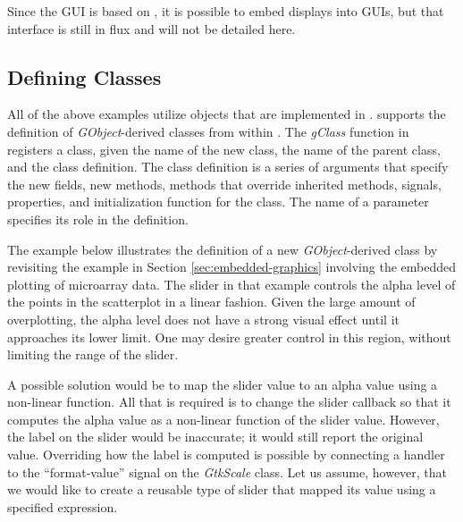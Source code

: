 \documentclass[article]{jss}
\begin{document}
Since the  GUI is based on , it is possible to
embed 
 displays into  GUIs, but that interface is
still in flux
and will not be detailed here.

\subsection[Defining GObject Classes]{Defining  Classes}

All of the above examples utilize objects that are implemented in
.
 supports the definition of \emph{GObject}-derived classes
from within
.  The \emph{gClass} function in  registers a 
class, given the name of the new class, the name of the parent class,
and the class 
definition. The class definition is a series of arguments that specify the new fields, new methods, 
methods that override inherited methods,
 signals, properties, and
initialization function for the class. The name of a parameter
specifies
its role in the definition. 

The example below illustrates the definition of a new
\emph{GObject}-derived
class by revisiting the example in Section \ref{sec:embedded-graphics} involving the embedded plotting of 
microarray data.
The slider in that example controls the alpha level of the
points in the scatterplot in a linear fashion. Given the large amount
of
overplotting, the alpha level does not have a strong visual effect
until it
approaches its lower limit. One may desire greater control in this
region,
without limiting the range of the slider. 

A possible solution would be to map the slider value to an alpha value
using a non-linear function. All that is required is to change the
slider callback so that it computes the alpha value as a non-linear
function of the slider value. However, the label on the slider would
be inaccurate; it would still report the original value.  Overriding
how the label is computed is possible by connecting a handler
to the
``format-value'' signal on the \emph{GtkScale} class. Let us assume,
however, that we would like to create a reusable type of slider that
mapped its value using a specified  expression.
\end{document}
